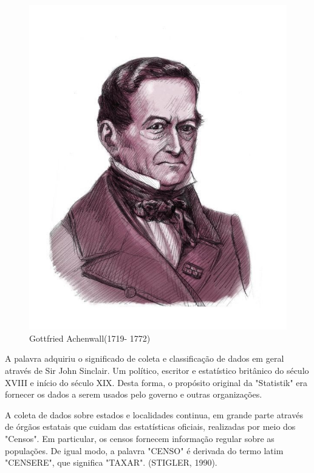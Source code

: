 \vspace{-5.25cm}
\begin{figure}
\centering
\includegraphics[scale=0.35]{figures/gottfried_achenwall.jpeg}
\vspace{-0.2cm}
\caption{Gottfried Achenwall(1719- 1772)}
\label{fig:my_label8}
\end{figure}


A palavra adquiriu o significado de coleta e classificação de dados em geral
através de Sir John Sinclair. Um político, escritor e estatístico britânico do século XVIII e início do século XIX. Desta forma, o propósito original da "Statistik" era fornecer os dados a serem usados pelo governo e outras organizações. \vskip0.3cm


\newpage
A coleta de dados sobre estados e localidades
continua, em grande parte através de órgãos estatais que cuidam das estatísticas oficiais, realizadas por meio dos "Censos". Em particular, os censos fornecem informação regular sobre as populações. De igual modo, a palavra "CENSO" é derivada do termo latim "CENSERE", que significa "TAXAR". (STIGLER, 1990).\vskip0.3cm






